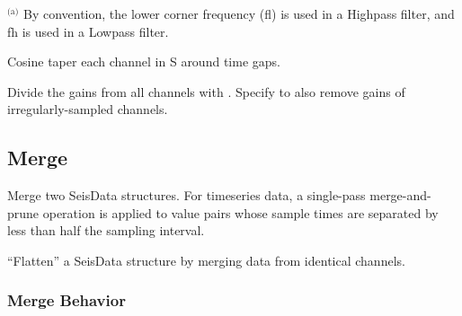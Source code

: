 \documentclass[letterpaper,11pt,english]{sphinxmanual}
\begin{document}
$^{\text{(a)}}$  By convention, the lower corner frequency (fl) is used in a Highpass
filter, and fh is used in a Lowpass filter.


\begin{fulllineitems}
\end{fulllineitems}


Cosine taper each channel in S around time gaps.


\begin{fulllineitems}
\end{fulllineitems}


Divide the gains from all channels  with . Specify  to
also remove gains of irregularly-sampled channels.


\subsection{Merge}
\label{\detokenize{src/Processing/processing:merge}}\label{\detokenize{src/Processing/processing:id1}}

\begin{fulllineitems}
\end{fulllineitems}


Merge two SeisData structures. For timeseries data, a single-pass merge-and-prune
operation is applied to value pairs whose sample times are separated by less than
half the sampling interval.


\begin{fulllineitems}
\end{fulllineitems}


“Flatten” a SeisData structure by merging data from identical channels.


\subsubsection{Merge Behavior}
\label{\detokenize{src/Processing/processing:merge-behavior}}
\end{document}
